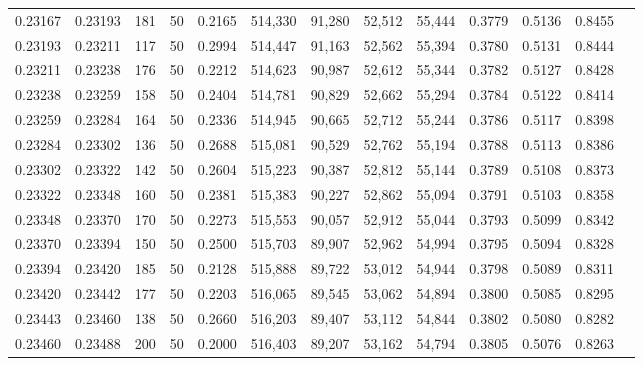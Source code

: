 \begin{tabular}{rrrrrrrrrrrrr}
0.23167 & 0.23193 &   181 &  50 &                                     0.2165 & 514,330 &  91,280 &  52,512 &  55,444 & 0.3779 & 0.5136 & 0.8455 \\
0.23193 & 0.23211 &   117 &  50 &                                     0.2994 & 514,447 &  91,163 &  52,562 &  55,394 & 0.3780 & 0.5131 & 0.8444 \\
0.23211 & 0.23238 &   176 &  50 &                                     0.2212 & 514,623 &  90,987 &  52,612 &  55,344 & 0.3782 & 0.5127 & 0.8428 \\
0.23238 & 0.23259 &   158 &  50 &                                     0.2404 & 514,781 &  90,829 &  52,662 &  55,294 & 0.3784 & 0.5122 & 0.8414 \\
0.23259 & 0.23284 &   164 &  50 &                                     0.2336 & 514,945 &  90,665 &  52,712 &  55,244 & 0.3786 & 0.5117 & 0.8398 \\
0.23284 & 0.23302 &   136 &  50 &                                     0.2688 & 515,081 &  90,529 &  52,762 &  55,194 & 0.3788 & 0.5113 & 0.8386 \\
0.23302 & 0.23322 &   142 &  50 &                                     0.2604 & 515,223 &  90,387 &  52,812 &  55,144 & 0.3789 & 0.5108 & 0.8373 \\
0.23322 & 0.23348 &   160 &  50 &                                     0.2381 & 515,383 &  90,227 &  52,862 &  55,094 & 0.3791 & 0.5103 & 0.8358 \\
0.23348 & 0.23370 &   170 &  50 &                                     0.2273 & 515,553 &  90,057 &  52,912 &  55,044 & 0.3793 & 0.5099 & 0.8342 \\
0.23370 & 0.23394 &   150 &  50 &                                     0.2500 & 515,703 &  89,907 &  52,962 &  54,994 & 0.3795 & 0.5094 & 0.8328 \\
0.23394 & 0.23420 &   185 &  50 &                                     0.2128 & 515,888 &  89,722 &  53,012 &  54,944 & 0.3798 & 0.5089 & 0.8311 \\
0.23420 & 0.23442 &   177 &  50 &                                     0.2203 & 516,065 &  89,545 &  53,062 &  54,894 & 0.3800 & 0.5085 & 0.8295 \\
0.23443 & 0.23460 &   138 &  50 &                                     0.2660 & 516,203 &  89,407 &  53,112 &  54,844 & 0.3802 & 0.5080 & 0.8282 \\
0.23460 & 0.23488 &   200 &  50 &                                     0.2000 & 516,403 &  89,207 &  53,162 &  54,794 & 0.3805 & 0.5076 & 0.8263 \\

\end{tabular}
